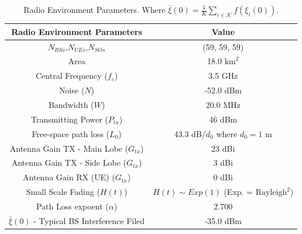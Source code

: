 \begin{table}[H]\centering
\caption{Radio Environment Parameters. Where $\bar \xi(0) =  \frac{1}{K} \sum\limits_{i \in \mathcal{K}} f\left(\xi_i(0)\right)$.}
\label{tab:Radio Environment Parameters}
\begin{tabular}{|c|c|}
\toprule
\textbf{Radio Environment Parameters} & \textbf{Value} \\
\midrule
$N_{BSs}$,$N_{UEs}$,$N_{SOs}$ & (59, 59, 59) \\
Area & 18.0 $\text{km}^2$ \\
Central Frequency ($f_c$) & 3.5 GHz \\
Noise ($N$) & -52.0 dBm \\
Bandwidth ($W$) & 20.0 MHz \\
Transmitting Power ($P_{tx}$) & 46 dBm \\
Free-space path loss ($L_{0}$) & 43.3 dB/$d_{0}$ where $d_{0} = 1$ m \\
Antenna Gain TX - Main Lobe ($G_{tx}$) & 23 dBi \\
Antenna Gain TX - Side Lobe ($G_{tx}$) & 3 dBi \\
Antenna Gain RX (UE) ($G_{tx}$) & 0 dBi \\
Small Scale Fading ($H(t)$) & $H(t) \sim Exp(1)$ (Exp. = $\text{Rayleigh}^2$) \\
Path Loss expoent ($\alpha$) & 2.700 \\
$\bar \xi(0)$ - Typical BS Interference Filed & -35.0 dBm \\
\bottomrule
\end{tabular}
\end{table}
